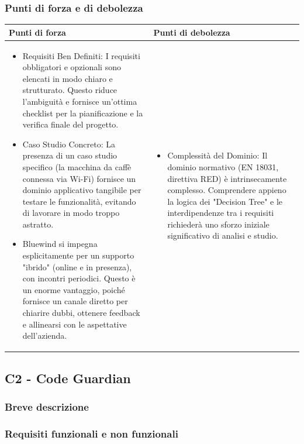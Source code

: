 \documentclass[a4paper,11pt]{article}
\begin{document}
\subsubsection{Punti di forza e di debolezza}
{\footnotesize
\begin{tabularx}{\textwidth}{|X|X|}
\hline
\rowcolor{lightgray!40} %
\textbf{Punti di forza} & \textbf{Punti di debolezza} \\
\hline
\begin{itemize}
\item Requisiti Ben Definiti: I requisiti obbligatori e opzionali sono elencati in modo chiaro e strutturato. Questo riduce l'ambiguità e fornisce un'ottima checklist per la pianificazione e la verifica finale del progetto.
\item Caso Studio Concreto: La presenza di un caso studio specifico (la macchina da caffè connessa via Wi-Fi) fornisce un dominio applicativo tangibile per testare le funzionalità, evitando di lavorare in modo troppo astratto.

\item Bluewind si impegna esplicitamente per un supporto "ibrido" (online e in presenza), con incontri periodici. Questo è un enorme vantaggio, poiché fornisce un canale diretto per chiarire dubbi, ottenere feedback e allinearsi con le aspettative dell'azienda.

\end{itemize}
 & \begin{itemize}
\item Complessità del Dominio: Il dominio normativo (EN 18031, direttiva RED) è intrinsecamente complesso. Comprendere appieno la logica dei "Decision Tree" e le interdipendenze tra i requisiti richiederà uno sforzo iniziale significativo di analisi e studio.
\end{itemize} \\
\hline
\end{tabularx}
}

\subsection{C2 - Code Guardian}
\subsubsection{Breve descrizione}
\subsubsection{Requisiti funzionali e non funzionali}
\end{document}
